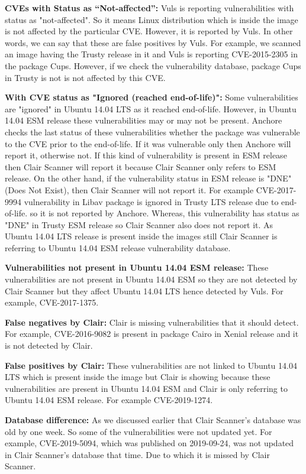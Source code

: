 \documentclass[a4paper,num-refs]{oup-contemporary}
\begin{document}
\textbf{CVEs with Status as “Not-affected”:} Vuls is reporting vulnerabilities with status
as "not-affected". So it means Linux distribution which is inside the image is not affected
by the particular CVE. However, it is reported by Vuls. In other words, we can say that
these are false positives by Vuls.
For example, we scanned an image having the Trusty release in it and Vuls is reporting CVE-2015-2305
in the package Cups. However, if we check the vulnerability database, package Cups in Trusty is not
is not affected by this CVE.

\textbf{With CVE status as "Ignored (reached end-of-life)":}
Some vulnerabilities are "ignored" in Ubuntu 14.04 LTS as it reached end-of-life. 
However, in Ubuntu 14.04 ESM release these vulnerabilities may or may not be present.
Anchore checks the last status of these vulnerabilities whether the package was vulnerable to the CVE
prior to the end-of-life. If it was vulnerable only then Anchore will report it, otherwise not.
If this kind of vulnerability is present in ESM release then Clair Scanner will report it because Clair Scanner
only refers to ESM release. On the other hand, if the vulnerability
status in ESM release is "DNE" (Does Not Exist), then Clair Scanner will not report it. 
For example CVE-2017-9994 vulnerability in Libav package is ignored in Trusty LTS release due to end-of-life.
so it is not reported by Anchore. Whereas, this vulnerability has status as "DNE" in Trusty ESM
release so Clair Scanner also does not report it. As Ubuntu 14.04 LTS release is present inside the images still
Clair Scanner is referring to Ubuntu 14.04 ESM release vulnerability database.

\textbf{Vulnerabilities not present in Ubuntu 14.04 ESM release:} These vulnerabilities are not present in Ubuntu 14.04 ESM so they 
are not detected by Clair Scanner but they affect Ubuntu 14.04 LTS hence detected by Vuls. For example, CVE-2017-1375.

\textbf{False negatives by Clair:} Clair is missing vulnerabilities that it should detect. For example, CVE-2016-9082 
is present in package Cairo in Xenial release and it is not detected by Clair.

\textbf{False positives by Clair:} These vulnerabilities are not linked to Ubuntu 14.04 LTS which is 
present inside the image but Clair is showing because these vulnerabilities are present in Ubuntu 14.04 ESM and 
Clair is only referring to Ubuntu 14.04 ESM release. For example CVE-2019-1274.

\textbf{Database difference:} As we discussed earlier that Clair Scanner's database was old by one week.
                So some of the vulnerabilities were not updated yet. For example, CVE-2019-5094, which
		was published on 2019-09-24, was not 
		updated in Clair Scanner's database that time. Due to which it is missed by Clair Scanner.
\end{document}
